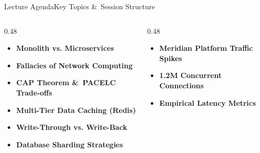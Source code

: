 \documentclass[aspectratio=169, 10pt]{beamer}
\begin{document}
\begin{frame}{Lecture Agenda}{Key Topics \&\ Session Structure}
  \vspace*{-0.3cm}
  \begin{columns}[T]
    \begin{column}{0.48\textwidth}
      \begin{tcolorbox}[nordiccard, title={\color{NordicBlue}\faLayerGroup\ \,Part I: Architectural Foundations}]
        \begin{itemize}
          \item \textbf{Monolith vs. Microservices}
          \item \textbf{Fallacies of Network Computing}
          \item \textbf{CAP Theorem \&\ PACELC Trade-offs}
        \end{itemize}
      \end{tcolorbox}
      
      \vspace*{0.05cm}
      
      \begin{tcolorbox}[nordiccard, title={\color{NordicTeal}\faDatabase\ \,Part II: Storage \& Caching}]
        \begin{itemize}
          \item \textbf{Multi-Tier Data Caching (Redis)}
          \item \textbf{Write-Through vs. Write-Back}
          \item \textbf{Database Sharding Strategies}
        \end{itemize}
      \end{tcolorbox}
    \end{column}

    \begin{column}{0.48\textwidth}
      \begin{tcolorbox}[nordiccard, title={\color{NordicBlue}\faCloud\ \,Part III: Production Case Study}]
        \begin{itemize}
          \item \textbf{Meridian Platform Traffic Spikes}
          \item \textbf{1.2M Concurrent Connections}
          \item \textbf{Empirical Latency Metrics}
        \end{itemize}
      \end{tcolorbox}
      

\end{column}
\end{columns}
\end{frame}
\end{document}
